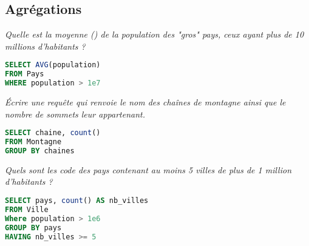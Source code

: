 \subsection{Agrégations} 
\begin{Exercise}
\it Quelle est la moyenne () de la population des "gros" pays, ceux ayant plus de 10 millions d'habitants ?
\end{Exercise}
\begin{Answer}
\begin{lstlisting}[language=SQL]
SELECT AVG(population)
FROM Pays
WHERE population > 1e7
\end{lstlisting}
\end{Answer}
\begin{Exercise}
\it Écrire une requête qui renvoie le nom des chaînes de montagne ainsi que le nombre de sommets leur appartenant.
\end{Exercise}
\begin{Answer}
\begin{lstlisting}[language=SQL]
SELECT chaine, count()
FROM Montagne
GROUP BY chaines
\end{lstlisting}
\end{Answer}
\begin{Exercise}
\it Quels sont les code des pays contenant au moins 5 villes de plus de 1 million d'habitants ?
\end{Exercise}
\begin{Answer}
\begin{lstlisting}[language=SQL]
SELECT pays, count() AS nb_villes
FROM Ville
Where population > 1e6
GROUP BY pays
HAVING nb_villes >= 5
\end{lstlisting}
\end{Answer}
